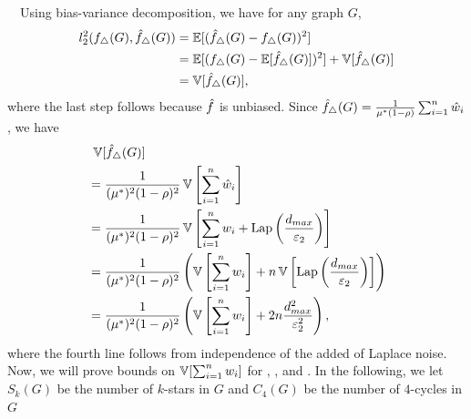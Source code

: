 {%
\smallskip
{}~~Using bias-variance decomposition, we have
for any graph $G$,
\begin{align*}
  l_2^2(f_\triangle(G), \hat{f}_\triangle(G)) &= \operatorname{\mathbb{E}}[(\hat{f}_\triangle(G) - f_\triangle(G))^2] \\
  &= \operatorname{\mathbb{E}}[(f_\triangle(G) - \operatorname{\mathbb{E}}[\hat{f}_\triangle(G)])^2] + \operatorname{\mathbb{V}}[\hat{f}_\triangle(G)] \\
  &= \operatorname{\mathbb{V}}[\hat{f}_\triangle(G)],
\end{align*}
where the last step follows because $\hat{f}$ is unbiased.
Since $\hat{f}_\triangle(G) = \frac{1}{\mu^*(1-\rho)} \sum_{i=1}^n \hat{w}_i$, we have
\begin{align}
  &\;\operatorname{\mathbb{V}}[\hat{f}_\triangle(G)] \nonumber \\
  &= \frac{1}{(\mu^*)^2(1-\rho)^2}\operatorname{\mathbb{V}}\left[\sum_{i=1}^n \hat{w}_i\right] \nonumber \\
  &= \frac{1}{(\mu^*)^2(1-\rho)^2}\operatorname{\mathbb{V}}\left[\sum_{i=1}^n w_i + \textrm{Lap}\left(\frac{d_{max}}{\varepsilon_2} \right)\right] \nonumber \\
  &= \frac{1}{(\mu^*)^2(1-\rho)^2}\left(\operatorname{\mathbb{V}}\left[\sum_{i=1}^n w_i\right] +
  n\operatorname{\mathbb{V}}\left[\textrm{Lap}\left(\frac{d_{max}}{\varepsilon_2}\right)\right]\right) \nonumber \\
  &= \frac{1}{(\mu^*)^2(1-\rho)^2}\left(\operatorname{\mathbb{V}}\left[\sum_{i=1}^n w_i\right] +
  2n\frac{d_{max}^2}{\varepsilon_2^2}\right), \label{eq:inter_var}
\end{align}
where the
fourth
line follows from independence of the added of Laplace noise.
Now, we will prove bounds on $\operatorname{\mathbb{V}}[\sum_{i=1}^nw_i]$ for \AlgOne{}, \AlgTwo{}, and
\AlgThree{}. In the following, we let $S_k(G)$ be the number of $k$-stars in
$G$ and $C_4(G)$ be the number of $4$-cycles in $G$

}
